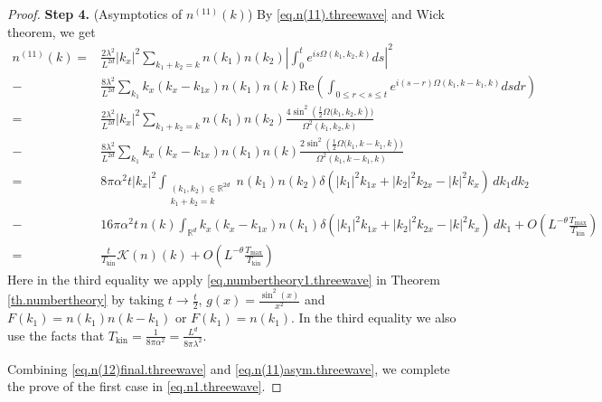 \begin{proof}
\textbf{Step 4.} (Asymptotics of $n^{(11)}(k)$) By \eqref{eq.n(11).threewave} and Wick theorem, we get 
\begin{equation}\label{eq.n(11)asym.threewave}
\begin{split}
    n^{(11)}(k)=&\frac{2\lambda^2}{L^{2d}} |k_x|^2\sum\limits_{k_1+k_2=k}n(k_1) n(k_2) \left|\int^{t}_0e^{i s\Omega(k_1,k_2,k)} ds\right|^2
    \\
    -&\frac{8\lambda^2}{L^{2d}}\sum_{k_1}k_x(k_x-k_{1x})n(k_1) n(k)\text{Re}\left(\int_{0\le r<s\le t} e^{i (s-r)\Omega(k_1,k-k_1,k)}  dsdr\right)
    \\
    =&\frac{2\lambda^2}{L^{2d}} |k_x|^2\sum\limits_{k_1+k_2=k}n(k_1) n(k_2) \frac{4\sin^2 \left(\frac{t}{2}\Omega(k_1,k_2,k\right))}{\Omega^2(k_1,k_2,k)}
    \\
    -&\frac{8\lambda^2}{L^{2d}}\sum_{k_1}k_x(k_x-k_{1x})n(k_1) n(k) \frac{2\sin^2 \left(\frac{t}{2}\Omega(k_1,k-k_1,k\right))}{\Omega^2(k_1,k-k_1,k)}
    \\
    =&8\pi \alpha^2t|k_x|^2\int_{\substack{(k_1, k_2)\in \mathbb{R}^{2d}\\k_1+k_2=k}}n(k_1) n(k_2)\delta(|k_1|^2k_{1x}+|k_2|^2k_{2x}-|k|^2k_{x})\, dk_1 dk_2
    \\
    -& 16\pi \alpha^2t\, n(k)\int_{\mathbb{R}^d}k_x(k_x-k_{1x})n(k_1) \delta(|k_1|^2k_{1x}+|k_2|^2k_{2x}-|k|^2k_{x})\, dk_1+O\left(L^{-\theta}\frac{T_{\text{max}}}{T_{\mathrm {kin}}}\right)
    \\
    =&\frac{t}{T_{\text{kin}}}\mathcal{K}(n)(k)+O\left(L^{-\theta}\frac{T_{\text{max}}}{T_{\mathrm {kin}}}\right)
\end{split}
\end{equation}
Here in the third equality we apply \eqref{eq.numbertheory1.threewave} in Theorem \ref{th.numbertheory} by taking $t\rightarrow\frac{t}{2}$, $g(x)=\frac{\sin^2(x)}{x^2}$ and $F(k_1)=n(k_1) n(k-k_1)$ or $F(k_1)=n(k_1)$. In the third equality we also use the facts that  $T_{\text{kin}}=\frac{1}{8\pi\alpha^2}=\frac{L^{d}}{8\pi\lambda^2}$.

Combining \eqref{eq.n(12)final.threewave} and \eqref{eq.n(11)asym.threewave}, we complete the prove of the first case in \eqref{eq.n1.threewave}.
\end{proof}
